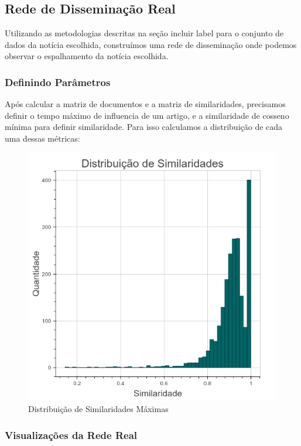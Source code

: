 \documentclass[a4paper,12pt]{article}
\begin{document}
\subsection{Rede de Disseminação Real}

Utilizando as metodologias descritas na seção {incluir label} para o conjunto de dados da notícia escolhida, construímos uma rede de disseminação
onde podemos observar o espalhamento da notícia escolhida.

\subsubsection{Definindo Parâmetros}

Após calcular a matriz de documentos e a matriz de similaridades, precisamos definir o tempo máximo de influencia de um artigo, e a similaridade de cosseno
mínima para definir similaridade. Para isso calculamos a distribuição de cada uma dessas métricas:

\begin{figure}[ht]
 \centering
 \includegraphics[scale=0.4]{./2.png}
 \caption{Distribuição de Similaridades Máximas}
\end{figure}


\subsubsection{Visualizações da Rede Real}
\end{document}
